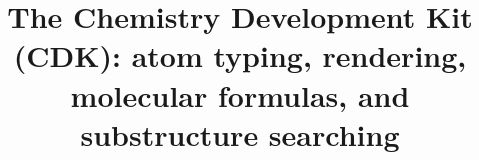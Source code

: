 \documentclass[10pt]{bmcart}
\begin{document}
\begin{frontmatter}

\begin{fmbox}

%

\title{The Chemistry Development Kit (CDK): atom typing, rendering, molecular formulas, and substructure searching}


\author[
   addressref={um},                                 %
   email={egon.willighagen@maastrichtuniversity.nl}
]{ }
\author[
   addressref={nm},
   email={john.may@cantab.net}
]{ }
\author[
   addressref={uppsala},
   email={jonathan.alvarsson@farmbio.uu.se}
]{ }
\author[
   addressref={uppsala},
   email={berg.arvid@gmail.com}
]{ }
\author[
   addressref={jena},
   email={kai.duehrkop@uni-jena.de}
]{ }
\author[
   addressref={idea},
   email={jeliazkova.nina@gmail.com}
]{ }
\author[
   addressref={leicester},
   email={shk12@le.ac.uk}
]{ }
\author[
   addressref={wi_mit},                             %
   email={pluskal@wi.mit.edu}
]{~}
\author[
   addressref={miquel},                             %
   email={mrojas@qca.es}
]{~}
\author[
   addressref={uppsala},
   email={ola.spjuth@farmbio.uu.se}
]{ }
\author[
   addressref={gilleain},                           %
   email={gilleain.torrance@gmail.com}
]{ }
\author[
   addressref={um},
   email={chris.evelo@maastrichtuniversity.nl}
]{ }
\author[
   addressref={nih},
   email={guhar@mail.nih.gov}
]{ }
\author[
   addressref={ebi},
   email={steinbeck@ebi.ac.uk}
]{~}


\end{fmbox}
\end{frontmatter}
\end{document}
